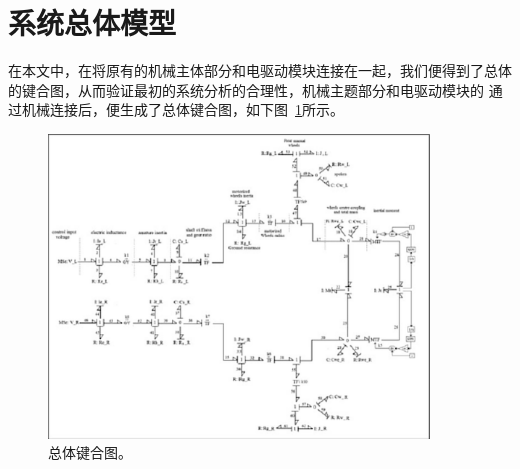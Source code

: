 \clearpage
\section{系统总体模型}

在本文中，在将原有的机械主体部分和电驱动模块连接在一起，我们便得到了总体的键合图，从而验证最初的系统分析的合理性，机械主题部分和电驱动模块的
通过机械连接后，便生成了总体键合图，如下图~\ref{fig:overall}所示。

\begin{figure}[!h]
	\centering
	\includegraphics[width=0.9\textwidth]{fig/overallv1.png}
	\caption{总体键合图。}\label{fig:overall}
\end{figure}
